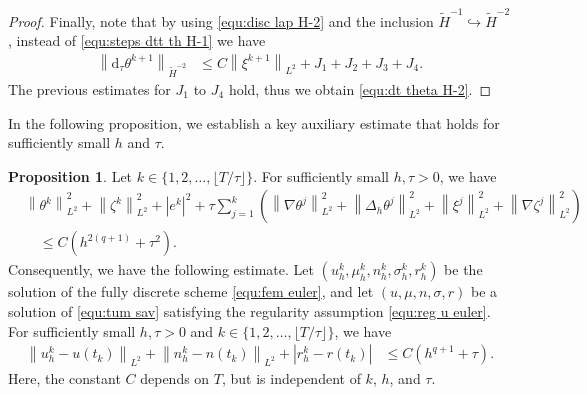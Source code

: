 \documentclass[11pt, reqno]{amsart}
\theoremstyle{definition}
\newtheorem{proposition}[theorem]{Proposition}
\numberwithin{equation}{section}
\newcommand{\dtt}{\mathrm{d}_\tau}
\newcommand{\norm}[2]{\left\|{#1}\right\|_{#2}}
\newcommand{\abs}[1]{\left|{#1}\right|}
\begin{document}
\begin{proof}
Finally, note that by using \eqref{equ:disc lap H-2} and the inclusion $\widetilde{H}^{-1}\hookrightarrow \widetilde{H}^{-2}$, instead of \eqref{equ:steps dtt th H-1} we have
\begin{align*}
	\norm{\dtt \theta^{k+1}}{\widetilde{H}^{-2}}
	&\leq
	C \norm{\xi^{k+1}}{L^2}
	+
	J_1+J_2+J_3+J_4.
\end{align*}
The previous estimates for $J_1$ to $J_4$ hold, thus we obtain \eqref{equ:dt theta H-2}.
\end{proof}

In the following proposition, we establish a key auxiliary estimate that holds for sufficiently small $h$ and $\tau$.

\begin{proposition}\label{pro:ind}
Let $k \in \{1,2,\ldots,\lfloor T/\tau \rfloor\}$. For sufficiently small $h,\tau>0$, we have
	\begin{align}\label{equ:error theta n eul}
		&\norm{\theta^k}{L^2}^2 + \norm{\zeta^k}{L^2}^2 +
		\abs{e^k}^2
		+
		\tau \sum_{j=1}^k \left(\norm{\nabla \theta^j}{L^2}^2
		+
		\norm{\Delta_h \theta^j}{L^2}^2
		+
		\norm{\xi^j}{L^2}^2
		+
		\norm{\nabla \zeta^j}{L^2}^2 \right)
		\nonumber\\
		&\quad \leq C(h^{2(q+1)}+ \tau^2).
	\end{align}
    Consequently, we have the following estimate. 
    {Let $(u_h^k,\mu_h^k,n_h^k,\sigma_h^k,r_h^k)$ be the solution of the fully discrete scheme \eqref{equ:fem euler}, and let $(u,\mu,n,\sigma,r)$ be a solution of \eqref{equ:tum sav} satisfying the regularity assumption \eqref{equ:reg u euler}}. For sufficiently small $h,\tau >0$ and $k\in \{1,2,\ldots,\lfloor T/\tau \rfloor\}$, we have
\begin{align}\label{equ:error euler L2}
	\norm{u_h^k-u(t_k)}{L^2}
	+
	\norm{n_h^k-n(t_k)}{L^2}
	+
	\abs{r_h^k-r(t_k)}
	&\leq
	C(h^{q+1}+\tau).
\end{align}
Here, the constant $C$ depends on $T$, but is independent of $k$, $h$, and $\tau$.
\end{proposition}
\end{document}
